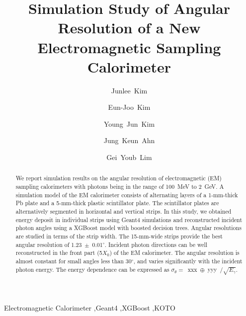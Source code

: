 \documentclass[preprint,12pt,times,a4paper]{elsarticle}
\begin{document}
\begin{frontmatter}

\setcounter{page}{0}
\title{Simulation Study of Angular Resolution of a New Electromagnetic Sampling Calorimeter}

\author[jbnu]{Junlee~Kim}
\author[jbnu]{Eun-Joo~Kim}

\author[korea]{Young~Jun~Kim}
\author[korea]{Jung~Keun~Ahn}

\author[kek]{Gei~Youb~Lim}


\address[jbnu]{Division of Science Education, Jeonbuk National University, Jeonju 54896, Korea}
\address[korea]{Department of Physics, Korea University, Seoul 02841, Korea}
\address[kek]{Institute of Particle and Nuclear Studies (IPNS), High Energy Accelerator Research Organization (KEK), Tsukuba 305-0801, Japan}


\begin{abstract}
We report simulation results on the angular resolution of electromagnetic (EM) sampling calorimeters with photons being in the range of 100~MeV to 2~GeV. A simulation model of the EM calorimeter consists of alternating layers of a 1-mm-thick Pb plate and a 5-mm-thick plastic scintillator plate. The scintillator plates are alternatively segmented in horizontal and vertical strips. In this study, we obtained energy deposit in individual strips using Geant4 simulations and reconstructed incident photon angles using a XGBoost model with boosted decision trees. Angular resolutions are studied in terms of the strip width. The 15-mm-wide strips provide the best angular resolution of 1.23~$\pm$~0.01$^{\circ}$. Incident photon directions can be well reconstructed in the front part (5$X_{0}$) of the EM calorimeter. The angular resolution is almost constant for small angles less than 30$^{\circ}$, and varies significantly with the incident photon energy. The
energy dependence can be expressed as $\sigma_{\theta}=$~xxx~$\oplus$~yyy~$/\sqrt{E_{\gamma}}$.

\end{abstract}
\begin{keyword}
Electromagnetic Calorimeter \sep Geant4 \sep XGBoost \sep KOTO
\end{keyword}

\end{frontmatter}
\end{document}
